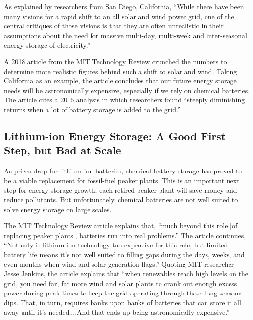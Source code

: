 \documentclass[hidelinks,12pt,a4paper]{article}
\begin{document}
As explained by researchers from San Diego, California, “While there have been many visions for a rapid shift to an all solar and wind power grid, one of the central critiques of those visions is that they are often unrealistic in their assumptions about the need for massive multi-day, multi-week and inter-seasonal energy storage of electricity.” \cite{PumpedEnergyStorageVitalToCalifornia}

A 2018 article from the MIT Technology Review crunched the numbers to determine more realistic figures behind such a shift to solar and wind. Taking California as an example, the article concludes that our future energy storage needs will be astronomically expensive, especially if we rely on chemical batteries. The article cites a 2016 analysis \cite{EnergyStorageDecarbonizingElectricity} in which researchers found “steeply diminishing returns when a lot of battery storage is added to the grid.” \cite{TheTwoPointFiveTrillionReasonWeCantRelyOnBatteries}


\subsection{Lithium-ion Energy Storage: A Good First Step, but Bad at Scale}
As prices drop for lithium-ion batteries, chemical battery storage has proved to be a viable replacement for fossil-fuel peaker plants. This is an important next step for energy storage growth; each retired peaker plant will save money and reduce pollutants. But unfortunately, chemical batteries are not well suited to solve energy storage on large scales.

The MIT Technology Review article explains that, “much beyond this role [of replacing peaker plants], batteries run into real problems.” \cite{TheTwoPointFiveTrillionReasonWeCantRelyOnBatteries} The article continues, “Not only is lithium-ion technology too expensive for this role, but limited battery life means it’s not well suited to filling gaps during the days, weeks, and even months when wind and solar generation flags.” \cite{TheTwoPointFiveTrillionReasonWeCantRelyOnBatteries} Quoting MIT researcher Jesse Jenkins, the article explains that “when renewables reach high levels on the grid, you need far, far more wind and solar plants to crank out enough excess power during peak times to keep the grid operating through those long seasonal dips. That, in turn, requires banks upon banks of batteries that can store it all away until it’s needed....And that ends up being astronomically expensive.” \cite{TheTwoPointFiveTrillionReasonWeCantRelyOnBatteries}
\end{document}
